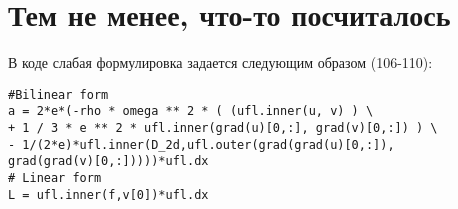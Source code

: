 \documentclass[a4paper,12pt]{article}
\begin{document}
\section{Тем не менее, что-то посчиталось}
В коде слабая формулировка задается следующим образом (106-110):
\begin{lstlisting}
#Bilinear form
a = 2*e*(-rho * omega ** 2 * ( (ufl.inner(u, v) ) \
+ 1 / 3 * e ** 2 * ufl.inner(grad(u)[0,:], grad(v)[0,:]) ) \
- 1/(2*e)*ufl.inner(D_2d,ufl.outer(grad(grad(u)[0,:]),
grad(grad(v)[0,:]))))*ufl.dx
# Linear form
L = ufl.inner(f,v[0])*ufl.dx
\end{lstlisting}
\end{document}
